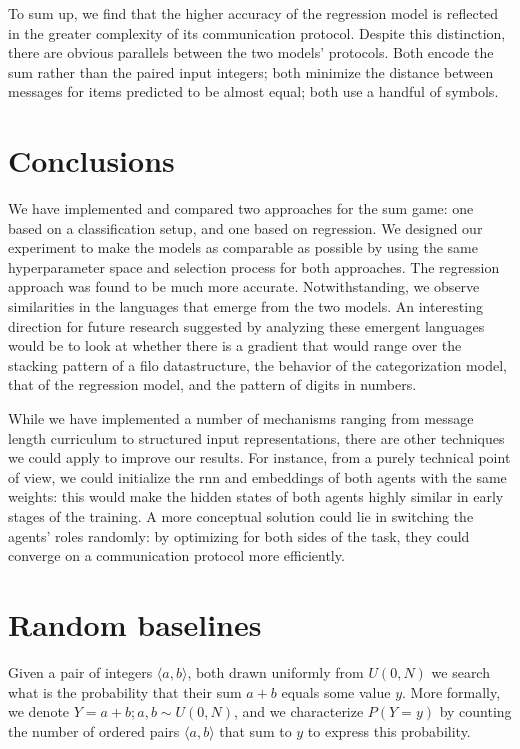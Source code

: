 \documentclass[twocolumn]{article}
\begin{document}
To sum up, we find that the higher accuracy of the regression model is reflected in the greater complexity of its communication protocol.
Despite this distinction, there are obvious parallels between the two models' protocols.
Both encode the sum rather than the paired input integers; both minimize the distance between messages for items predicted to be almost equal; both use a handful of symbols.

\section{Conclusions}
We have implemented and compared two approaches for the sum game: one based on a classification setup, and one based on regression.
We designed our experiment to make the models as comparable as possible by using the same hyperparameter space and selection process for both approaches.
The regression approach was found to be much more accurate.
Notwithstanding, we observe similarities in the languages that emerge from the two models.
An interesting direction for future research suggested by analyzing these emergent languages would be to look at whether there is a gradient that would range over the stacking pattern of a {\sc filo} datastructure, the behavior of the categorization model, that of the regression model, and the pattern of digits in numbers. 

While we have implemented a number of mechanisms ranging from message length curriculum to structured input representations, there are other techniques we could apply to improve our results.
For instance, from a purely technical point of view, we could initialize the {\sc rnn} and embeddings of both agents with the same weights: this would make the hidden states of both agents highly similar in early stages of the training.
A more conceptual solution could lie in switching the agents' roles randomly: by optimizing for both sides of the task, they could converge on a communication protocol more efficiently.

\appendix

\section{Random baselines} \label{sec:baselines}

Given a pair of integers $\langle a,b \rangle$, both drawn uniformly from $U(0, N)$ we search what is the probability that their sum $a+b$ equals some value $y$.
More formally, we denote $Y = a+b ; a, b \sim U(0, N)$, and we characterize $P(Y=y)$ by counting the number of ordered pairs $\langle a,b \rangle$ that sum to $y$ to express this probability.
\end{document}
